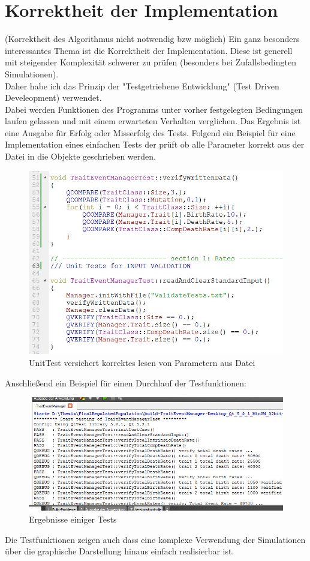 \documentclass[11pt, a4paper, german]{article}
\begin{document}
\section{Korrektheit der Implementation}
(Korrektheit des Algorithmus nicht notwendig bzw möglich)
Ein ganz besonders interessantes Thema ist die Korrektheit der Implementation. Diese ist generell mit steigender Komplexität schwerer zu prüfen (besonders bei Zufallsbedingten Simulationen).\\
Daher habe ich das Prinzip der "{}Testgetriebene Entwicklung"{}  (Test Driven Develeopment) verwendet.\\
Dabei werden Funktionen des Programms unter vorher festgelegten Bedingungen laufen gelassen und mit einem erwarteten Verhalten verglichen. Das Ergebnis ist eine Ausgabe für Erfolg oder Misserfolg des Tests. Folgend ein Beispiel für eine Implementation eines einfachen Tests der prüft ob alle Parameter korrekt aus der Datei in die Objekte geschrieben werden.
\begin{figure}[H]
	\centering
	\includegraphics[width=0.7\linewidth]{./Pictures/UnitTest}
	\caption[UnitTest]{UnitTest versichert korrektes lesen von Parametern aus Datei}
	\label{Unit Test}
\end{figure}
Anschließend ein Beispiel für einen Durchlauf der Testfunktionen:
\begin{figure}[H]
	\centering
	\includegraphics[width=0.7\linewidth]{./Pictures/TestResult_start}
	\caption[Test Resultat einer Test Datei]{Ergebnisse einiger Tests}
	\label{Test Results}
\end{figure}
Die Testfunktionen zeigen auch dass eine komplexe Verwendung der Simulationen über die graphische Darstellung hinaus einfach realisierbar ist.
\end{document}

